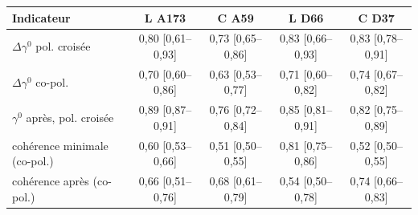 \begin{tabular}{lcccc}
\toprule
Indicateur & L A173 & C A59 & L D66 & C D37 \\
\midrule
$\Delta\gamma^0$ pol. croisée & 0{,}80 {\scriptsize [0{,}61--0{,}93]} & 0{,}73 {\scriptsize [0{,}65--0{,}86]} & 0{,}83 {\scriptsize [0{,}66--0{,}93]} & 0{,}83 {\scriptsize [0{,}78--0{,}91]} \\
$\Delta\gamma^0$ co-pol. & 0{,}70 {\scriptsize [0{,}60--0{,}86]} & 0{,}63 {\scriptsize [0{,}53--0{,}77]} & 0{,}71 {\scriptsize [0{,}60--0{,}82]} & 0{,}74 {\scriptsize [0{,}67--0{,}82]} \\
$\gamma^0$ après, pol. croisée & 0{,}89 {\scriptsize [0{,}87--0{,}91]} & 0{,}76 {\scriptsize [0{,}72--0{,}84]} & 0{,}85 {\scriptsize [0{,}81--0{,}91]} & 0{,}82 {\scriptsize [0{,}75--0{,}89]} \\
cohérence minimale (co-pol.) & 0{,}60 {\scriptsize [0{,}53--0{,}66]} & 0{,}51 {\scriptsize [0{,}50--0{,}55]} & 0{,}81 {\scriptsize [0{,}75--0{,}86]} & 0{,}52 {\scriptsize [0{,}50--0{,}55]} \\
cohérence après (co-pol.) & 0{,}66 {\scriptsize [0{,}51--0{,}76]} & 0{,}68 {\scriptsize [0{,}61--0{,}79]} & 0{,}54 {\scriptsize [0{,}50--0{,}78]} & 0{,}74 {\scriptsize [0{,}66--0{,}83]} \\
\bottomrule
\end{tabular}

